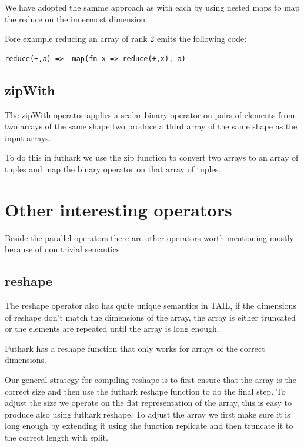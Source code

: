 \documentclass[11pt]{article}
\begin{document}
We have adopted the samme approach as with each by using nested maps to map the reduce on the innermost dimension.

Fore example reducing an array of rank 2 emits the following code:

\begin{lstlisting}[numbers=none,frame=none]
reduce(+,a)	=> 	map(fn x => reduce(+,x), a)
\end{lstlisting}

\subsection{zipWith}

The zipWith operator applies a scalar binary operator on pairs of elements from two arrays of the same shape two
produce a third array of the same shape as the input arrays.

To do this in futhark we use the zip function to convert two arrays to an array of tuples and map the binary operator on that array of tuples.

\section{Other interesting operators}

Beside the parallel operators there are other operators worth mentioning mostly because of non trivial semantics.  

\subsection{reshape}

The reshape operator also has quite unique semantics in TAIL, if the dimensions of reshape don't match the dimensions of the array, the
array is either truncated or the elements are repeated until the array is long enough.

Futhark has a reshape function that only works for arrays of the correct dimensions.

Our general strategy for compiling reshape is to first ensure that the array is the correct size and then use the futhark reshape
function to do the final step. To adjust the size we operate on the flat representation of the array, this is easy to produce also
using futhark reshape. To adjust the array we first make sure it is long enough by extending it using the function replicate and then
truncate it to the correct length with split.
\end{document}
